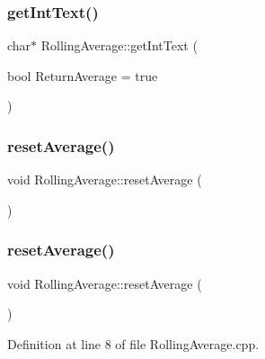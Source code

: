 \subsubsection{\texorpdfstring{get\+Int\+Text()}{getIntText()}\hspace{0.1cm}{\footnotesize\ttfamily [2/2]}}
{\footnotesize\ttfamily char$\ast$ Rolling\+Average\+::get\+Int\+Text (\begin{DoxyParamCaption}\item[{bool}]{Return\+Average = {\ttfamily true} }\end{DoxyParamCaption})}

\mbox{\label{class_rolling_average_a5413499ba156dd5acec73196edfda3d4}} 
\subsubsection{\texorpdfstring{reset\+Average()}{resetAverage()}\hspace{0.1cm}{\footnotesize\ttfamily [1/2]}}
{\footnotesize\ttfamily void Rolling\+Average\+::reset\+Average (\begin{DoxyParamCaption}{ }\end{DoxyParamCaption})}

\mbox{\label{class_rolling_average_a5413499ba156dd5acec73196edfda3d4}} 
\subsubsection{\texorpdfstring{reset\+Average()}{resetAverage()}\hspace{0.1cm}{\footnotesize\ttfamily [2/2]}}
{\footnotesize\ttfamily void Rolling\+Average\+::reset\+Average (\begin{DoxyParamCaption}{ }\end{DoxyParamCaption})}



Definition at line 8 of file Rolling\+Average.\+cpp.

